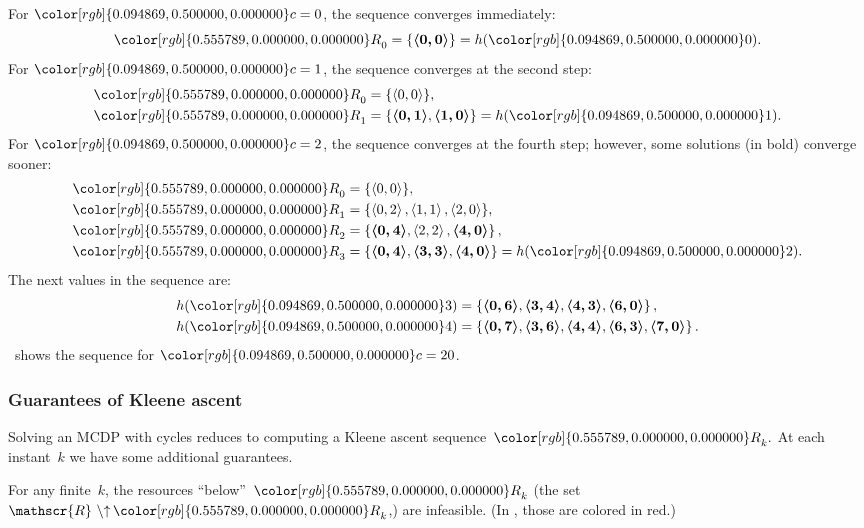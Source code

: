 \documentclass[twocolumn,english]{IEEEtran}
\theoremstyle{definition}
\theoremstyle{plain}
\theoremstyle{definition}
\theoremstyle{remark}
\theoremstyle{definition}
\theoremstyle{plain}
\theoremstyle{plain}
\newcommand{\upit}{{\uparrow\,}}
\newcommand{\ftor}{{h}}
\newcommand{\ressp}{\mathscr{R}}
\newcommand{\colR}{\color[rgb]{0.555789,0.000000,0.000000}}
\newcommand{\colF}{\color[rgb]{0.094869,0.500000,0.000000}}
\newcommand{\R}[1]{{\colR #1}}
\newcommand{\F}[1]{{\colF #1}}
\begin{document}
\noindent For $\F{c}=0$, the sequence converges immediately: 
\[
\R{R}_{0}=\{\boldsymbol{\left\langle 0,0\right\rangle }\}=\ftor(\F{0}).
\]
 For $\F{c}=1$, the sequence converges at the second step:
\begin{align*}
\R{R}_{0} & =\{\left\langle 0,0\right\rangle \},\\
\R{R}_{1} & =\{\boldsymbol{\left\langle 0,1\right\rangle },\boldsymbol{\left\langle 1,0\right\rangle }\}=\ftor(\F{1}).
\end{align*}
For $\F{c}=2$, the sequence converges at the fourth step; however,
some solutions (in bold) converge sooner:
\begin{align*}
\R{R}_{0} & =\{\left\langle 0,0\right\rangle \},\\
\R{R}_{1} & =\{\left\langle 0,2\right\rangle ,\left\langle 1,1\right\rangle ,\left\langle 2,0\right\rangle \},\\
\R{R}_{2} & =\left\{ \boldsymbol{\left\langle 0,4\right\rangle },\left\langle 2,2\right\rangle ,\boldsymbol{\left\langle 4,0\right\rangle }\right\} ,\\
\R{R}_{3} & =\{\boldsymbol{\left\langle 0,4\right\rangle },\boldsymbol{\left\langle 3,3\right\rangle },\boldsymbol{\left\langle 4,0\right\rangle }\}=\ftor(\F{2}).
\end{align*}
The next values in the sequence are:
\begin{align*}
\ftor(\F{3}) & =\left\{ \boldsymbol{\left\langle 0,6\right\rangle },\boldsymbol{\left\langle 3,4\right\rangle },\boldsymbol{\left\langle 4,3\right\rangle },\boldsymbol{\left\langle 6,0\right\rangle }\right\} ,\\
\ftor(\F{4}) & =\left\{ \boldsymbol{\left\langle 0,7\right\rangle },\boldsymbol{\left\langle 3,6\right\rangle },\boldsymbol{\left\langle 4,4\right\rangle },\boldsymbol{\left\langle 6,3\right\rangle },\boldsymbol{\left\langle 7,0\right\rangle }\right\} .
\end{align*}
~shows the sequence for $\F{c}=20$.

\subsubsection*{Guarantees of Kleene ascent}

\noindent Solving an MCDP with cycles reduces to computing a Kleene
ascent sequence~$\R{R}_{k}.$ At each instant~$k$ we have some
additional guarantees. 

For any finite~$k$, the resources ``below''~$\R{R}_{k}$ (the
set~$\ressp\ \backslash\upit\R{R}_{k}$,) are infeasible. (In ,
those are colored in red.) 
\end{document}
